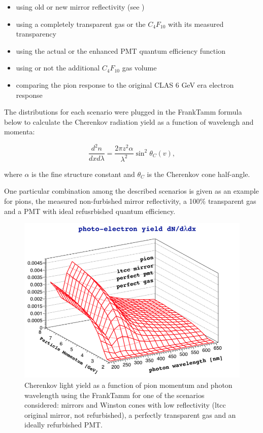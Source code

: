 \begin{itemize}
	\item using old or new mirror reflectivity (see )
	\item using a completely transparent gas or the $C_4F_{10}$ with its measured transparency
	\item using the actual or the enhanced PMT quantum efficiency function
	\item using or not the additional $C_4F_{10}$ gas volume
	\item comparing the pion response to the original CLAS 6 GeV era electron response
\end{itemize}

The distributions for each scenario were plugged in the Frank\textendash Tamm formula \cite{Frank:1937fk} below to calculate
the Cherenkov radiation yield as a function of wavelengh and momenta:


\begin{equation} \label{eq:cerenkov}
	\frac{d^2n}{dxd\lambda} = \frac{2\pi z^2\alpha}{\lambda^2}\sin^2{\theta_C(v)},
\end{equation}

where $\alpha$ is the fine structure constant and $\theta_C$ is the Cherenkov cone half-angle.

One particular combination among the described scenarios is given as an example  for pions,
the measured non-furbished mirror reflectivity, a 100$\%$ transparent gas and a PMT with ideal refusrbished quantum efficiency.

\begin{figure}
	\centering
	\includegraphics[width=0.95\columnwidth,keepaspectratio]{img/photonYieldStudy.png}
	\caption{Cherenkov light yield as a function of pion momentum and photon wavelength using the Frank\textendash Tamm for one of the scenarios considered:
            mirrors and Winston cones with low reflectivity (ltcc original mirror, not refurbished), a perfectly transparent gas and an ideally refurbished PMT.}
	\label{fig:photonYieldStudy}
\end{figure}


